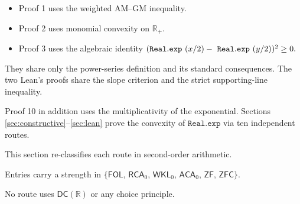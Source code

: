 \documentclass[11pt,reqno]{amsart}
\makeatletter
\providecommand{\R}{\mathbb{R}}
\theoremstyle{redplain}
\renewenvironment{quotation}
{\list{}{\listparindent\z@
		\itemindent\z@
		\rightmargin\leftmargin
		\parsep\z@}	\item\relax}
{\endlist}
\numberwithin{equation}{section}
\makeatother
\begin{document}
\begin{itemize}
\item Proof 1 uses the weighted AM--GM inequality.

\item Proof 2 uses monomial convexity on $\R_{+}$.

\item Proof 3 uses the algebraic identity $(\mathtt{Real.exp}\ (x/2)-\mathtt{%
\ Real.exp}\ (y/2))^{2}\geq 0.$
\end{itemize}

\begin{quotation}
\medskip

They share only the power-series definition and its standard consequences.
The two Lean's proofs share the slope criterion and the strict
supporting-line inequality.

Proof 10 in addition uses the multiplicativity of the exponential. \noindent
Sections \ref{sec:constructive}--\ref{sec:lean} prove the convexity of $%
\mathtt{Real.exp}$ via ten independent routes. \noindent

This section re-classifies each route in second-order arithmetic.

Entries carry a strength in $\{\mathsf{FOL},\,\mathsf{RCA}_{0},\,\mathsf{WKL}
_{0},\,\mathsf{ACA}_{0},\,\mathsf{ZF},\,\mathsf{ZFC}\}.$

No route uses $\mathsf{DC}\left( \mathbb{R}\right) $ or any choice principle.
\end{quotation}
\end{document}

